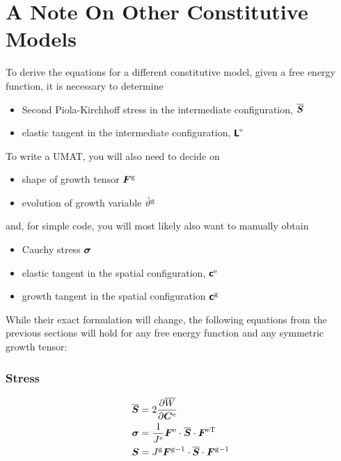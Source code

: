 \documentclass[10pt,letterpaper,oneside]{report}
\newcommand{\ten}[1]{\mbox{\boldmath $#1$}{}}
\newcommand{\tenf}[1]{\mbox{{\sffamily{\bfseries {#1}}}}}
\newcommand{\scas}[1]{\mbox{{\scriptsize{${\rm{#1}}$}}}{}}
\begin{document}
\newpage
\section{A Note On Other Constitutive Models}
To derive the equations for a different constitutive model, given a free energy function, it is necessary to determine
\begin{itemize}
\item Second Piola-Kirchhoff stress in the intermediate configuration, $\overline{ \ten{S} }$
\item elastic tangent in the intermediate configuration, $\tenf{L}^{\scas{e}}$
\end{itemize}
To write a UMAT, you will also need to decide on
\begin{itemize}
\item shape of growth tensor $\ten{F}^{\scas{g}}$
\item evolution of growth variable $\dot{\vartheta}^{\scas{g}}$
\end{itemize}
and, for simple code, you will most likely also want to manually obtain
\begin{itemize}
\item Cauchy stress $\ten{\sigma}$
\item elastic tangent in the spatial configuration, $\tenf{c}^{\scas{e}}$
\item growth tangent in the spatial configuration $\tenf{c}^{\scas{g}}$
\end{itemize}
While their exact formulation will change, the following equations from the previous sections will hold for any free energy function and any symmetric growth tensor:
\subsubsection{Stress}
\begin{align}
\overline{\ten{S}} ={}& 2 \frac{\partial \overline{W}}{\partial \ten{C}^{\scas{e}}}  
\\
\ten{\sigma} ={}& \frac{1}{J^{\scas{e}}} \ten{F}^{\scas{e}} \cdot \overline{\ten{S}} \cdot \ten{F}^{\scas{eT}}  
\\
\ten{S} ={}& J^{\scas{g}} \ten{F}^{\scas{g}-1} \cdot \overline{\ten{S}} \cdot \ten{F}^{\scas{g}-1}
\end{align}
\end{document}
